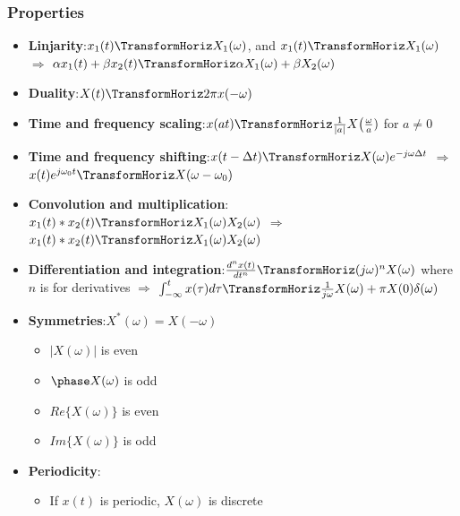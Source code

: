 \begin{multicols}{2}
\subsubsection{Properties}
\begin{itemize}
    \item \textbf{Linjarity}:\newline $x_1(t) \TransformHoriz X_1(\omega)$, and
     $x_1(t) \TransformHoriz X_1(\omega)$ $\Rightarrow$
     $\alpha x_1(t) + \beta x_2(t) \TransformHoriz \alpha X_1(\omega) + \beta X_2(\omega)$
    \item \textbf{Duality}:\newline $X(t) \TransformHoriz 2\pi x(-\omega)$
    \item \textbf{Time and frequency scaling}:\newline $x(at) \TransformHoriz \frac{1}{|a|}X\big(\frac{\omega}{a})$ for $a\neq0$
    \item \textbf{Time and frequency shifting}:\newline $x(t-\Delta t) \TransformHoriz X(\omega)e^{-j\omega\Delta t}$
    $\Rightarrow$ $x(t)e^{j\omega_0 t} \TransformHoriz X(\omega-\omega_0)$
    \item \textbf{Convolution and multiplication}:\newline $x_1(t)*x_2(t) \TransformHoriz X_1(\omega)X_2(\omega)$ 
    $\Rightarrow$ $x_1(t)*x_2(t) \TransformHoriz X_1(\omega)X_2(\omega)$
    \item \textbf{Differentiation and integration}:\newline $\frac{d^nx(t)}{dt^n} \TransformHoriz (j\omega)^n X(\omega)$ 
    where $n$ is for derivatives \newline
    $\Rightarrow$ $\int_{-\infty}^t x(\tau)d\tau \TransformHoriz \frac{1}{j\omega} X(\omega) + \pi X(0)\delta(\omega)$
    \item \textbf{Symmetries}:\newline $X^*(\omega) = X(-\omega)$
    \begin{itemize}
        \item $|X(\omega)|$ is even
        \item $\phase X(\omega)$ is odd
        \item $Re\{X(\omega)\}$ is even
        \item $Im\{X(\omega)\}$ is odd
    \end{itemize}
    \item \textbf{Periodicity}:
    \begin{itemize}
        \item If $x(t)$ is periodic, $X(\omega)$ is discrete

\end{itemize}
\end{itemize}
\end{multicols}
